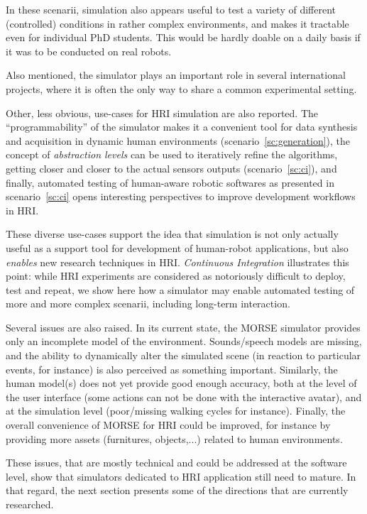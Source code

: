 \documentclass[conference]{IEEEtran}
\begin{document}
In these scenarii, simulation also appears useful to test a variety of different
(controlled) conditions in rather complex environments, and makes it tractable
even for individual PhD students. This would be hardly doable on a daily basis
if it was to be conducted on real robots.

Also mentioned, the simulator plays an important role in several international
projects, where it is often the only way to share a common experimental setting.

Other, less obvious, use-cases for HRI simulation are also reported. The
``programmability'' of the simulator makes it a convenient tool for data
synthesis and acquisition in dynamic human environments
(scenario~\ref{sc:generation}), the concept of \emph{abstraction levels} can be
used to iteratively refine the algorithms, getting closer and closer to the
actual sensors outputs (scenario~\ref{sc:ci}), and finally, automated testing of
human-aware robotic softwares as presented in scenario~\ref{sc:ci} opens
interesting perspectives to improve development workflows in HRI.

These diverse use-cases support the idea that simulation is not only actually
useful as a support tool for development of human-robot applications, but also
\emph{enables} new research techniques in HRI. \emph{Continuous Integration}
illustrates this point: while HRI experiments are considered as notoriously
difficult to deploy, test and repeat, we show here how a simulator may enable
automated testing of more and more complex scenarii, including long-term
interaction.

Several issues are also raised. In its current state, the MORSE simulator
provides only an incomplete model of the environment. Sounds/speech models are
missing, and the ability to dynamically alter the simulated scene (in reaction
to particular events, for instance) is also perceived as something important.
Similarly, the human model(s) does not yet provide good enough accuracy, both at
the level of the user interface (some actions can not be done with the
interactive avatar), and at the simulation level (poor/missing walking
cycles for instance). Finally, the overall convenience of MORSE for HRI could
be improved, for instance by providing more assets (furnitures, objects,...)
related to human environments.

These issues, that are mostly technical and could be addressed at the software
level, show that simulators dedicated to HRI application still need to mature.
In that regard, the next section presents some of the directions that are
currently researched.
\end{document}
